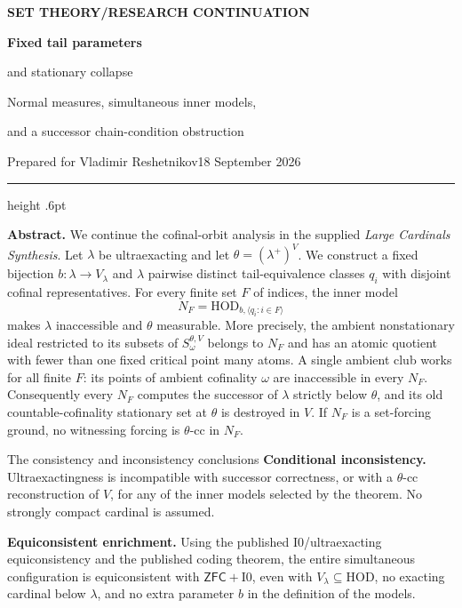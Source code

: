 \documentclass[11pt,letterpaper]{article}
\theoremstyle{definition}
\numberwithin{equation}{section}
\newcommand{\ZFC}{\mathsf{ZFC}}
\newcommand{\HOD}{\mathrm{HOD}}
\newcommand{\Izero}{\mathrm{I0}}
\begin{document}
\thispagestyle{empty}
{\sffamily\bfseries\small\color{Olive}SET THEORY\quad /\quad RESEARCH CONTINUATION}

\vspace{13pt}
{\fontsize{28}{31}\selectfont\bfseries\color{Forest}Fixed tail parameters\par and stationary collapse\par}
\vspace{10pt}
{\fontsize{14}{18}\selectfont Normal measures, simultaneous inner models,\par and a successor chain-condition obstruction\par}
\vspace{14pt}
{\color{Muted}Prepared for Vladimir Reshetnikov\hfill 18 September 2026\par}
\vspace{3pt}
{\color{Sage}\hrule height .6pt}
\vspace{12pt}

\textbf{Abstract.}
We continue the cofinal-orbit analysis in the supplied \emph{Large Cardinals Synthesis}. Let $\lambda$ be ultraexacting and let $\theta=(\lambda^+)^V$. We construct a fixed bijection $b:\lambda\to V_\lambda$ and $\lambda$ pairwise distinct tail-equivalence classes $q_i$ with disjoint cofinal representatives. For every finite set $F$ of indices, the inner model
\[
N_F=\HOD_{b,\langle q_i:i\in F\rangle}
\]
makes $\lambda$ inaccessible and $\theta$ measurable. More precisely, the ambient nonstationary ideal restricted to its subsets of $S_\omega^{\theta,V}$ belongs to $N_F$ and has an atomic quotient with fewer than one fixed critical point many atoms. A single ambient club works for all finite $F$: its points of ambient cofinality $\omega$ are inaccessible in every $N_F$. Consequently every $N_F$ computes the successor of $\lambda$ strictly below $\theta$, and its old countable-cofinality stationary set at $\theta$ is destroyed in $V$. If $N_F$ is a set-forcing ground, no witnessing forcing is $\theta$-cc in $N_F$.

\begin{assessment}{The consistency and inconsistency conclusions}
\textbf{Conditional inconsistency.} Ultraexactingness is incompatible with successor correctness, or with a $\theta$-cc reconstruction of $V$, for any of the inner models selected by the theorem. No strongly compact cardinal is assumed.

\textbf{Equiconsistent enrichment.} Using the published $\Izero$/ultraexacting equiconsistency and the published coding theorem, the entire simultaneous configuration is equiconsistent with $\ZFC+\Izero$, even with $V_\lambda\subseteq\HOD$, no exacting cardinal below $\lambda$, and no extra parameter $b$ in the definition of the models.
\end{assessment}
\end{document}
